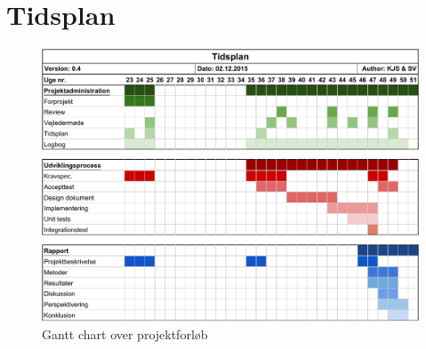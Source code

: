 
\section{Tidsplan}
\begin{figure}[H]
	\centering
	\includegraphics[width = 1.3\textwidth, angle=90,origin=c]{billeder/Tidsplanv04.pdf}
	\caption{Gantt chart over projektforløb}
\end{figure}
